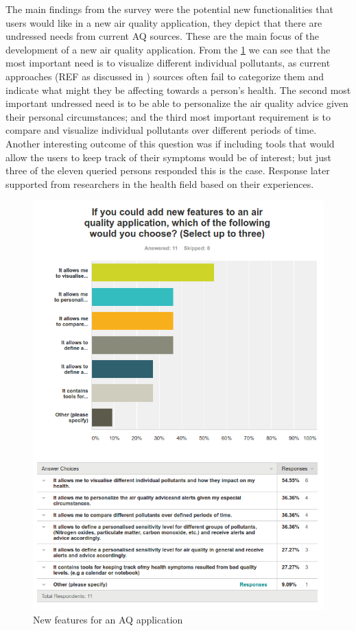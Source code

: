 The main findings from the survey were the potential new functionalities that users would like in a new air quality application, they depict that there are undressed needs from current AQ sources. These are the main focus of the development of a new air quality application. From the \ref{fig:survey_new_features} we can see that the most important need is to visualize different individual pollutants, as current approaches (REF as discussed in ) sources often fail to categorize them and indicate what might they be affecting towards a person's health. The second most important undressed need is to be able to personalize the air quality advice given their personal circumstances; and the third most important requirement is to compare and visualize individual pollutants over different periods of time. Another interesting outcome of this question was if including tools that would allow the users to keep track of their symptoms would be of interest; but just three of the eleven queried persons responded this is the case. Response later supported from researchers in the health field based on their experiences. 


\begin{figure}[H]
\begin{adjustbox}{width=.5\textwidth,center=\textwidth}
  \centering
  \includegraphics[scale=1]{images/new_features.png}
\end{adjustbox}
  \caption[New features for an AQ application]{New features for an AQ application}
  \label{fig:survey_new_features}
\end{figure}

